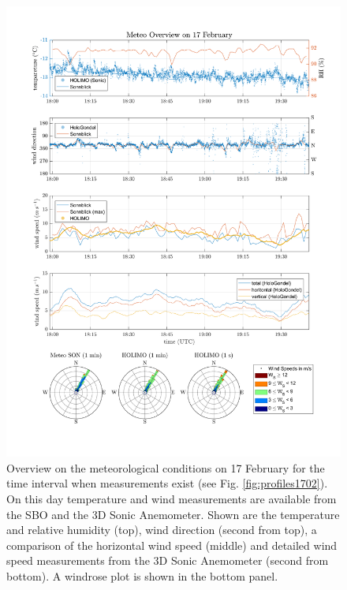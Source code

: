 \documentclass[draft,linenumbers]{agujournal}
\begin{document}
\begin{figure}[t]
 \centering
 	\includegraphics[width=14cm]{MeteoOverview_1702.png}
 \caption{Overview on the meteorological conditions on 17 February for the time interval when measurements exist (see Fig. \ref{fig:profiles1702}). On this day temperature and wind measurements are available from the SBO and the 3D Sonic Anemometer. Shown are the temperature and relative humidity (top), wind direction (second from top), a comparison of the horizontal wind speed (middle) and detailed wind speed measurements from the 3D Sonic Anemometer (second from bottom). A windrose plot is shown in the bottom panel.}
 \label{fig:meteo1702}
\end{figure}
\end{document}
